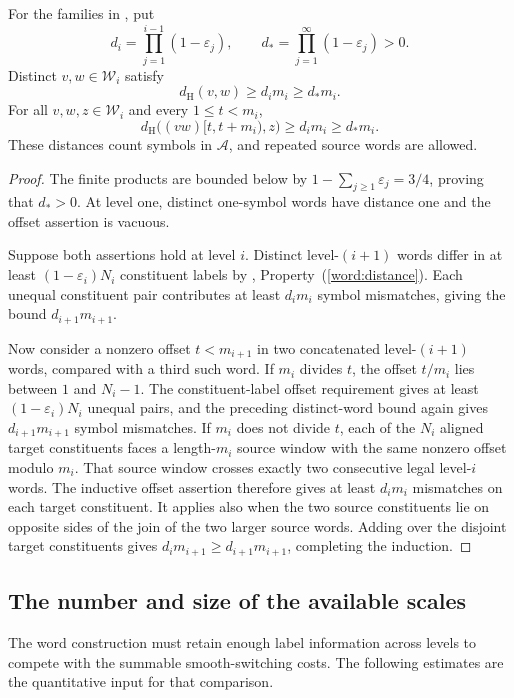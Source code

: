 \begin{lemma}\label{lem:recognition}
For the families in , put
\[
 d_i=\prod_{j=1}^{i-1}(1-\varepsilon_j),\qquad
 d_*=\prod_{j=1}^{\infty}(1-\varepsilon_j)>0.
\]
Distinct $v,w\in\mathcal W_i$ satisfy
\[
 d_{\mathrm H}(v,w)\ge d_i m_i\ge d_*m_i.
\]
For all $v,w,z\in\mathcal W_i$ and every $1\le t<m_i$,
\[
 d_{\mathrm H}\bigl((vw)[t,t+m_i),z\bigr)
     \ge d_i m_i\ge d_*m_i.
\]
These distances count symbols in $\mathcal A$, and repeated source
words are allowed.
\end{lemma}
\begin{proof}
The finite products are bounded below by
$1-\sum_{j\ge1}\varepsilon_j=3/4$, proving that $d_*>0$.
At level one, distinct one-symbol words have distance one and the
offset assertion is vacuous.

Suppose both assertions hold at level $i$.
Distinct level-$(i+1)$ words differ in at least
$(1-\varepsilon_i)N_i$ constituent labels by
, Property~(\ref{word:distance}).
Each unequal constituent pair contributes at least $d_i m_i$
symbol mismatches, giving the bound $d_{i+1}m_{i+1}$.

Now consider a nonzero offset $t<m_{i+1}$ in two concatenated
level-$(i+1)$ words, compared with a third such word.
If $m_i$ divides $t$, the offset $t/m_i$ lies between $1$ and $N_i-1$.
The constituent-label offset requirement gives at least
$(1-\varepsilon_i)N_i$ unequal pairs, and the preceding distinct-word
bound again gives $d_{i+1}m_{i+1}$ symbol mismatches.
If $m_i$ does not divide $t$, each of the $N_i$ aligned target
constituents faces a length-$m_i$ source window with the same nonzero
offset modulo $m_i$.  That source window crosses exactly two
consecutive legal level-$i$ words.  The inductive offset assertion
therefore gives at least $d_i m_i$ mismatches on each target
constituent.  It applies also when the two source constituents lie
on opposite sides of the join of the two larger source words.
Adding over the disjoint target constituents gives
$d_i m_{i+1}\ge d_{i+1}m_{i+1}$, completing the induction.
\end{proof}

\subsection{The number and size of the available scales}

The word construction must retain enough label information across
levels to compete with the summable smooth-switching costs.
The following estimates are the quantitative input for that comparison.

